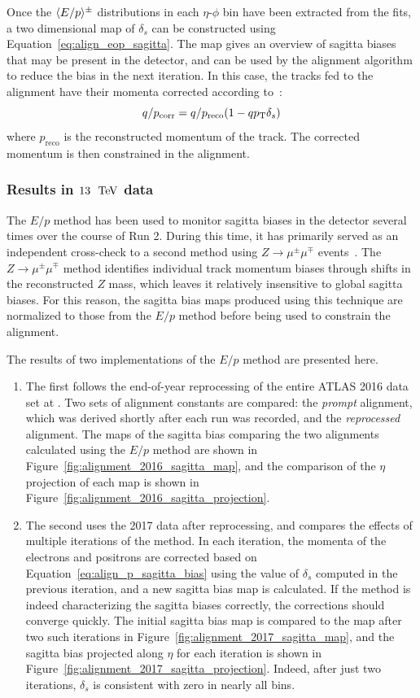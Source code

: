 Once the $\langle E/p\rangle^\pm$ distributions in each $\eta$-$\phi$ bin have been extracted from the fits, a two dimensional map of $\delta_s$ can be constructed using Equation~\ref{eq:align_eop_sagitta}.
The map gives an overview of sagitta biases that may be present in the detector, and can be used by the alignment algorithm to reduce the bias in the next iteration.
In this case, the tracks fed to the alignment have their momenta corrected according to~\cite{2012.alignment-systematics}:
\begin{equation}
q/p_{\textrm{corr}} = q/p_{\textrm{reco}}(1-qp_{\mathrm{T}}\delta_s)
\end{equation}
where $p_{\textrm{reco}}$ is the reconstructed momentum of the track.
The corrected momentum is then constrained in the alignment.

\subsubsection{Results in $13~\tev$ data}
The $E/p$ method has been used to monitor sagitta biases in the detector several times over the course of Run 2.
During this time, it has primarily served as an independent cross-check to a second method using $Z\rightarrow\mu^{\pm}\mu^{\mp}$ events~\cite{2012.alignment-systematics}.
The $Z\rightarrow\mu^{\pm}\mu^{\mp}$ method identifies individual track momentum biases through shifts in the reconstructed $Z$ mass, which leaves it relatively insensitive to global sagitta biases.
For this reason, the sagitta bias maps produced using this technique are normalized to those from the $E/p$ method before being used to constrain the alignment.

The results of two implementations of the $E/p$ method are presented here.
\begin{enumerate}
\item The first follows the end-of-year reprocessing of the entire ATLAS 2016 data set at .
Two sets of alignment constants are compared: the \emph{prompt} alignment, which was derived shortly after each run was recorded, and the \emph{reprocessed} alignment.
The maps of the sagitta bias comparing the two alignments calculated using the $E/p$ method are shown in Figure~\ref{fig:alignment_2016_sagitta_map}, and the comparison of the $\eta$ projection of each map is shown in Figure~\ref{fig:alignment_2016_sagitta_projection}.
\item The second uses the 2017 data after reprocessing, and compares the effects of multiple iterations of the method.
In each iteration, the momenta of the electrons and positrons are corrected based on Equation~\ref{eq:align_p_sagitta_bias} using the value of $\delta_s$ computed in the previous iteration, and a new sagitta bias map is calculated.
If the method is indeed characterizing the sagitta biases correctly, the corrections should converge quickly.
The initial sagitta bias map is compared to the map after two such iterations in Figure~\ref{fig:alignment_2017_sagitta_map}, and the sagitta bias projected along $\eta$ for each iteration is shown in Figure~\ref{fig:alignment_2017_sagitta_projection}.
Indeed, after just two iterations, $\delta_s$ is consistent with zero in nearly all bins.
\end{enumerate}

